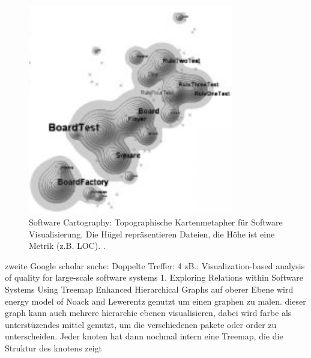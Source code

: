 \begin{figure}
    \centering
    \includegraphics[width=0.8\textwidth]{images/literatur/softwareCartography.png}
    \caption{Software Cartography: Topographische Kartenmetapher für Software Visualisierung. Die Hügel repräsentieren Dateien, die Höhe ist eine Metrik (z.B. LOC). \cite{softwareCartography}.}
    \label{fig:softwareCartography}
\end{figure}

zweite Google scholar suche:
Doppelte Treffer: 4 zB.: Visualization-based analysis of quality for large-scale software systems \cite{visbasedlarge}
1. Exploring Relations within Software Systems Using Treemap Enhanced Hierarchical Graphs \cite{exploringRelations}
auf oberer Ebene wird energy model of Noack and Lewerentz genutzt um einen graphen zu malen. 
dieser graph kann auch mehrere hierarchie ebenen visualisieren, dabei wird farbe als unterstüzendes mittel genutzt, um die verschiedenen pakete oder order zu unterscheiden.
Jeder knoten hat dann nochmal intern eine Treemap, die die Struktur des knotens zeigt

